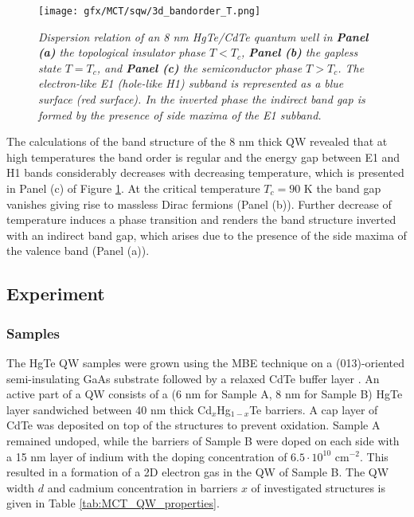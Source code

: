 \documentclass[titlepage,a4paper]{book}
\newcommand{\wciecie}{\quad\phantom{v}}
\begin{document}
\begin{figure}[ht]
	\centering
	\texttt{[image: gfx/MCT/sqw/3d\_bandorder\_T.png]}
	\vspace{-10pt}
	\caption{\textit{Dispersion relation of an 8 nm HgTe/CdTe quantum well in \textbf{Panel (a)} the topological insulator phase $T < T_c$, \textbf{Panel (b)} the gapless state $T = T_c$, and \textbf{Panel (c)} the semiconductor phase $T > T_c$. The electron-like E1 (hole-like H1) subband is represented as a blue surface (red surface). In the inverted phase the indirect band gap is formed by the presence of side maxima of the E1 subband.}}
	\label{fig:3D_bandorder_HgTe}
\end{figure} 

The calculations of the band structure of the 8 nm thick QW revealed that at high temperatures the band order is regular and the energy gap between E1 and H1 bands considerably decreases with decreasing temperature, which is presented in Panel (c) of Figure \ref{fig:3D_bandorder_HgTe}. At the critical temperature $T_c = 90$ K the band gap vanishes giving rise to massless Dirac fermions (Panel (b)). Further decrease of temperature induces a phase transition and renders the band structure inverted with an indirect band gap, which arises due to the presence of the side maxima of the valence band (Panel (a)).

\subsection{Experiment}
\subsubsection{Samples}
\wciecie
The HgTe QW samples were grown using the MBE technique on a (013)-oriented semi-insulating GaAs substrate followed by a relaxed CdTe buffer layer \cite{Dvoretsky_Samples}. An active part of a QW consists of a (6 nm for Sample A, 8 nm for Sample B) HgTe layer sandwiched between 40 nm thick Cd$_x$Hg$_{1-x}$Te barriers. A cap layer of CdTe was deposited on top of the structures to prevent oxidation. Sample A remained undoped, while the barriers of Sample B were doped on each side with a 15 nm layer of indium with the doping concentration of $6.5\cdot10^{10}$ cm$^{-2}$. This resulted in a formation of a 2D electron gas in the QW of Sample B. The QW width $d$ and cadmium concentration in barriers $x$ of investigated structures is given in Table \ref{tab:MCT_QW_properties}.   
\end{document}
